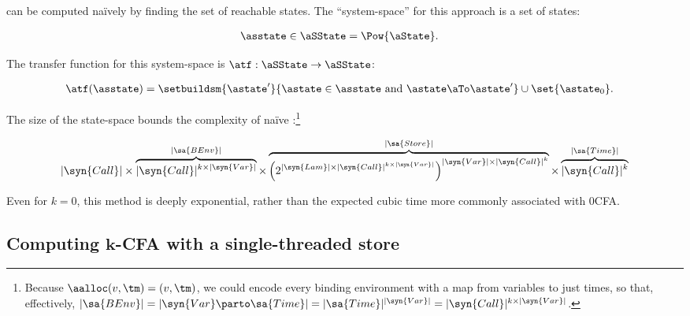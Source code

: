 \kCFA{} can be computed na\"ively by finding the set of reachable
states.
The ``system-space'' for this approach is a set of states:
\begin{small}\begin{align*}
  \asstate \in \aSState &= \Pow{\aState}
  \text.
\end{align*}\end{small}The transfer function for this system-space is $\atf : \aSState \to \aSState$:
\begin{small}\begin{align*}
  \atf(\asstate) &= \setbuildsm{ \astate' }{ \astate \in \asstate \text{ and } \astate \aTo \astate' } \cup \set{ \astate_0 }
  \text.
\end{align*}\end{small}The size of the state-space bounds the complexity of na\"ive
\kCFA{}:\footnote{Because $\aalloc(v,\tm) = (v,\tm)$, we could encode
  every binding environment with a map from variables to just times,
  so  that, effectively, $|\sa{BEnv}| = |\syn{Var} \parto \sa{Time}| =
  |\sa{Time}|^{|\syn{Var}|} = |\syn{Call}|^{k\times{|\syn{Var}|}}$.}
\begin{small}\begin{align*}
  |\syn{Call}|
  \times 
  \overbrace{|\syn{Call}|^{k\times{|\syn{Var}|}}}^{|\sa{BEnv}|}
  \times
  \overbrace{\left(2^{|\syn{Lam}|\times|\syn{Call}|^{k \times {|\syn{Var}|}}}\right)^{|\syn{Var}|\times |\syn{Call}|^k}}^{|\sa{Store}|}
  \times 
  \overbrace{|\syn{Call}|^k}^{|\sa{Time}|}
\end{align*}\end{small}Even for $k = 0$, this method is deeply exponential, rather than the
expected cubic time more commonly associated with 0CFA.




\subsection{Computing $\boldsymbol k$-CFA with a single-threaded store} 

